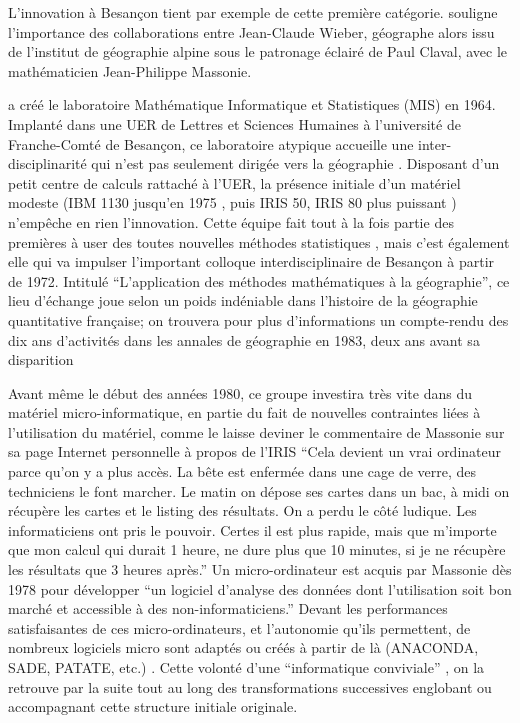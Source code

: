 L'innovation à Besançon tient par exemple de cette première catégorie. \textcite[131]{Cuyala2014} souligne l’importance des collaborations entre Jean-Claude Wieber, géographe alors issu de l’institut de géographie alpine sous le patronage éclairé de Paul Claval, avec le mathématicien Jean-Philippe Massonie.

\textcite{Massonie1986} a créé le laboratoire Mathématique Informatique et Statistiques (MIS) en 1964. Implanté dans une UER de Lettres et Sciences Humaines à l’université de Franche-Comté de Besançon, ce laboratoire atypique accueille une inter-disciplinarité qui n'est pas seulement dirigée vers la géographie . Disposant d’un petit centre de calculs rattaché à l'UER, la présence initiale d'un matériel modeste (IBM 1130 jusqu'en 1975 \autocite[22]{Wieber1980}, puis IRIS 50, IRIS 80 plus puissant \autocite{Massonie1986}) n'empêche en rien l'innovation. Cette équipe fait tout à la fois partie des premières à user des toutes nouvelles méthodes statistiques \autocite{Massonie1971}, mais c'est également elle qui va impulser l'important colloque interdisciplinaire de Besançon à partir de 1972. Intitulé \enquote{L'application des méthodes mathématiques à la géographie}, ce lieu d'échange joue selon \autocite[331]{Cuyala2014} un poids indéniable dans l'histoire de la géographie quantitative française; on trouvera pour plus d'informations un compte-rendu des dix ans d'activités dans les annales de géographie en 1983, deux ans avant sa disparition \autocite{Massonie1983}

Avant même le début des années 1980, ce groupe investira très vite dans du matériel micro-informatique, en partie du fait de nouvelles contraintes liées à l'utilisation du matériel, comme le laisse deviner le commentaire de Massonie sur sa page Internet personnelle à propos de l'IRIS \enquote{Cela devient un vrai ordinateur parce qu'on y a plus accès. La bête est enfermée dans une cage de verre, des techniciens le font marcher. Le matin on dépose ses cartes dans un bac, à midi on récupère les cartes et le listing des résultats. On a perdu le côté ludique. Les informaticiens ont pris le pouvoir. Certes il est plus rapide, mais que m'importe que mon calcul qui durait 1 heure, ne dure plus que 10 minutes, si je ne récupère les résultats que 3 heures après.} Un micro-ordinateur est acquis par Massonie dès 1978 pour développer \enquote{un logiciel d'analyse des données dont l'utilisation soit bon marché et accessible à des non-informaticiens.} Devant les performances satisfaisantes de ces micro-ordinateurs, et l'autonomie qu'ils permettent, de nombreux logiciels micro sont adaptés ou créés à partir de là (ANACONDA, SADE, PATATE, etc.) \autocite{Massonie1986}. Cette volonté d'une \enquote{informatique conviviale} \autocite{TSH1984}, on la retrouve par la suite tout au long des transformations successives englobant ou accompagnant cette structure initiale originale.

